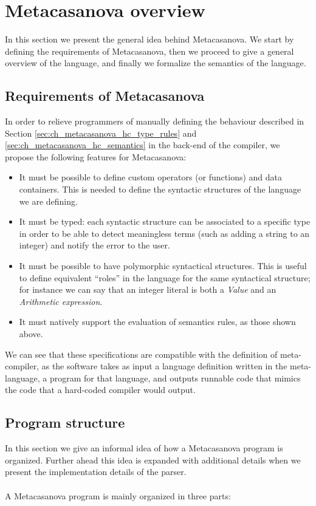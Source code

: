\section{Metacasanova overview}
\label{sec:ch_metacasanova_metacasanova_overview}
In this section we present the general idea behind Metacasanova. We start by defining the requirements of Metacasanova, then we proceed to give a general overview of the language, and finally we formalize the semantics of the language.

\subsection{Requirements of Metacasanova}
In order to relieve programmers of manually defining the behaviour described in Section \ref{sec:ch_metacasanova_hc_type_rules} and \ref{sec:ch_metacasanova_hc_semantics} in the back-end of the compiler, we propose the following features for Metacasanova:

\begin{itemize}
	\item It must be possible to define custom operators (or functions) and data containers. This is needed to define the syntactic structures of the language we are defining.
	\item It must be typed: each syntactic structure can be associated to a specific type in order to be able to detect meaningless terms (such as adding a string to an integer) and notify the error to the user.
	\item It must be possible to have polymorphic syntactical structures. This is useful to define equivalent ``roles'' in the language for the same syntactical structure; for instance we can say that an integer literal is both a \textit{Value} and an \textit{Arithmetic expression}.
	\item It must natively support the evaluation of semantics rules, as those shown above.
\end{itemize}

We can see that these specifications are compatible with the definition of meta-compiler, as the software takes as input a language definition written in the meta-language, a program for that language, and outputs runnable code that mimics the code that a hard-coded compiler would output.

\subsection{Program structure}
In this section we give an informal idea of how a Metacasanova program is organized. Further ahead this idea is expanded with additional details when we present the implementation details of the parser.  \\\\
A Metacasanova program is mainly organized in three parts:


